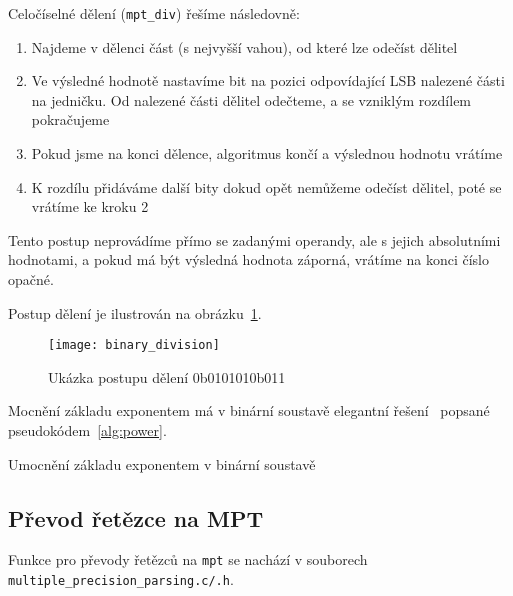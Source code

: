 Celočíselné dělení (\verb|mpt_div|) řešíme následovně:
\begin{enumerate}
    \item Najdeme v dělenci část (s nejvyšší vahou), od které lze odečíst dělitel
    \item Ve výsledné hodnotě nastavíme bit na pozici odpovídající LSB nalezené části na jedničku. Od nalezené části dělitel odečteme, a se vzniklým rozdílem pokračujeme
    \item Pokud jsme na konci dělence, algoritmus končí a výslednou hodnotu vrátíme
    \item K rozdílu přidáváme další bity dokud opět nemůžeme odečíst dělitel, poté se vrátíme ke kroku 2 
\end{enumerate}

Tento postup neprovádíme přímo se zadanými operandy, ale s jejich absolutními hodnotami, a pokud má být výsledná hodnota záporná, vrátíme na konci číslo opačné.

Postup dělení je ilustrován na obrázku~\ref{fig:binary_division}.

\begin{figure}[ht]
    \centering
    \texttt{[image: binary\_division]}
    \caption{Ukázka postupu dělení 0b010101\textdiv0b011}\label{fig:binary_division}
\end{figure}
\newpage

Mocnění základu exponentem má v binární soustavě elegantní řešení~\cite{bib:power} popsané pseudokódem~\ref{alg:power}.

\begin{algorithm}[H]
\caption{Umocnění základu exponentem v binární soustavě}\label{alg:power}
\begin{algorithmic}[1]
\scriptsize{
	\EndIf{}
	\EndIf{}
        \EndIf{}
    \EndFor{}
\EndFunction{}
}
\end{algorithmic}
\end{algorithm}

\subsection{Převod řetězce na MPT}
Funkce pro převody řetězců na \verb|mpt| se nachází v souborech \\ \verb|multiple_precision_parsing.c/.h|.

